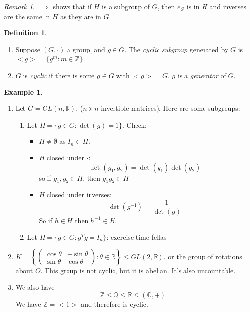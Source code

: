 \documentclass{report}
\theoremstyle{remark}
\newtheorem{remark}[theorem]{Remark}
\theoremstyle{definition}
\newtheorem{definition}[theorem]{Definition}
\theoremstyle{definition}
\newtheorem{example}[theorem]{Example}
\theoremstyle{theorem}
\begin{document}
\begin{remark}
$\implies$ shows that if $H$ is a subgroup of $G$, then $e_G$ is in $H$ and inverses are the same in $H$ as they are in $G$.
\end{remark}
\begin{definition}
\begin{enumerate}[label=\roman*)]
    \item Suppose $(G, \cdot)$ a group[ and $g \in G$. The \emph{cyclic subgroup} generated by $G$ is $<g>=\{g^m:m \in \mathbb{Z}\}$.
    \item $G$ is \emph{cyclic} if there is some $g \in G$ with $<g>=G$. $g$ is a \emph{generator} of $G$.
\end{enumerate}
\end{definition}
\begin{example}
\begin{enumerate}[label=\textcircled{\tiny{\arabic*}}]
    \item Let $G=GL(n, \mathbb{R})$. ($n \times n$ invertible matrices). Here are some subgroups:
    \begin{enumerate}[label=\arabic*)]
        \item Let $H=\{g \in G: \det(g)=1\}$. Check:
        \begin{itemize}
            \item $H \neq \emptyset$ as $I_n \in H$.
            \item $H$ closed under $\cdot$:
            \[\det(g_1,g_2)=\det(g_1)\det(g_2)\]
            so if $g_1, g_2 \in H$, then $g_1g_2 \in H$
            \item $H$ closed under inverses:
            \[\det(g^{-1})=\frac{1}{\det(g)}\]
            So if $h \in H$ then $h^{-1} \in H$.
        \end{itemize}
        \item Let $H=\{g \in G: g^Tg=I_n\}$: exercise time fellas
    \end{enumerate}
    \item $K=\left\{\begin{pmatrix}
    \cos\theta&-\sin\theta\\
    \sin\theta&\cos\theta
    \end{pmatrix}: \theta \in \mathbb{R}\right\} \leq GL(2, \mathbb{R})$, or the group of rotations about $O$. This group is not cyclic, but it is abelian. It's also uncountable.
    \item We also have
    \[\mathbb{Z} \leq \mathbb{Q} \leq \mathbb{R} \leq (\mathbb{C}, +)\]
    We have $\mathbb{Z} = <1>$ and therefore is cyclic.

\end{enumerate}
\end{example}
\end{document}
